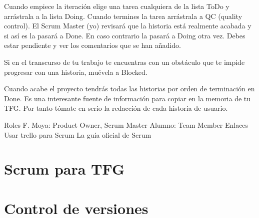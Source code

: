 Cuando empiece la iteración elige una tarea cualquiera de la lista ToDo y arrástrala a la lista Doing. Cuando termines la tarea arrástrala a QC (quality control). El Scrum Master (yo) revisará que la historia está realmente acabada y si así es la pasará a Done. En caso contrario la pasará a Doing otra vez. Debes estar pendiente y ver los comentarios que se han añadido.

Si en el transcurso de tu trabajo te encuentras con un obstáculo que te impide progresar con una historia, muévela a Blocked.

Cuando acabe el proyecto tendrás todas las historias por orden de terminación en Done. Es una interesante fuente de información para copiar en la memoria de tu TFG. Por tanto tómate en serio la redacción de cada historia de usuario.

Roles
F. Moya: Product Owner, Scrum Master
Alumno: Team Member
Enlaces
Usar trello para Scrum
La guía oficial de Scrum

\section{Scrum para TFG}

\section{Control de versiones}
